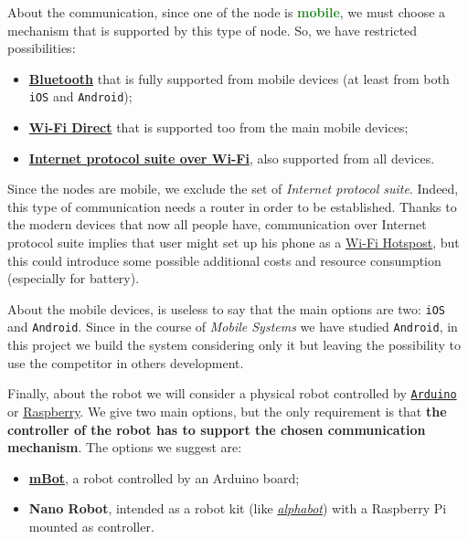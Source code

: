 About the communication, since one of the node is \textcolor{ForestGreen}{\textbf{mobile}}, we must choose a mechanism that is supported by this type of node. So, we have restricted possibilities:
\begin{itemize}
	\item \href{https://en.wikipedia.org/wiki/Bluetooth}{\textbf{Bluetooth}} that is fully supported from mobile devices (at least from both \texttt{iOS} and \texttt{Android});
	\item \href{https://en.wikipedia.org/wiki/Wi-Fi_Direct}{\textbf{Wi-Fi Direct}} that is supported too from the main mobile devices;
	\item  \href{https://en.wikipedia.org/wiki/Internet_protocol_suite}{\textbf{Internet protocol suite over Wi-Fi}}, also supported from all devices.
\end{itemize}

Since the nodes are mobile, we exclude the set of \textit{Internet protocol suite}. Indeed, this type of communication needs a router in order to be established.
Thanks to the modern devices that now all people have, communication over Internet protocol suite implies that user might set up his phone as a \href{https://en.wikipedia.org/wiki/Hotspot_(Wi-Fi)}{Wi-Fi Hotspost}, but this could introduce some possible additional costs and resource consumption (especially for battery).

About the mobile devices, is useless to say that the main options are two: \texttt{iOS} and \texttt{Android}. Since in the course of \textit{Mobile Systems} we have studied \texttt{Android}, in this project we build the system considering only it but leaving the possibility to use the competitor in others development.

Finally, about the robot we will consider a physical robot controlled by \href{https://en.wikipedia.org/wiki/Arduino}{\texttt{Arduino}} or \href{https://en.wikipedia.org/wiki/Raspberry_Pi}{Raspberry}. We give two main options, but the only requirement is that \textbf{the controller of the robot has to support the chosen communication mechanism}.
The options we suggest are:
\begin{itemize}
	\item \href{https://www.makeblock.com/steam-kits/mbot}{\textbf{mBot}}, a robot controlled by an Arduino board;
	\item \textbf{Nano Robot}, intended as a robot kit (like \href{https://www.waveshare.com/alphabot-pi.htm}{\textit{alphabot}}) with a Raspberry Pi mounted as controller.
\end{itemize}

